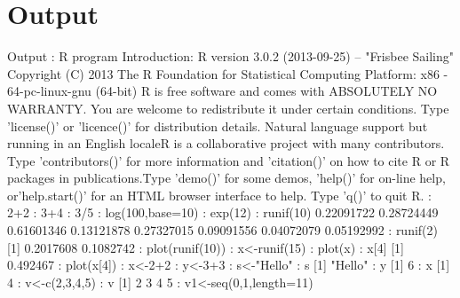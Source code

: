 \documentclass[10pt,a4paper]{article}
\begin{document}
{{\section{Output}
Output :
R program Introduction:
R version 3.0.2 (2013-09-25) -- "Frisbee Sailing"
\newline
Copyright (C) 2013 The R Foundation for Statistical Computing
Platform: x86 - 64-pc-linux-gnu (64-bit) R is free software and comes 
with ABSOLUTELY NO WARRANTY. You are welcome to redistribute it under certain conditions. Type 'license()' or 'licence()' for distribution details. Natural language support but running in an English localeR is a collaborative project with many contributors. Type 'contributors()' for more information and 'citation()' on how to cite R or R packages in publications.Type 'demo()' for some demos, 'help()' for on-line help, or'help.start()' for an HTML browser interface to help. Type 'q()' to quit R.
\newline
: 2+2
\newline
: 3+4
\newline
: 3/5
\newline
: log(100,base=10)
\newline
: exp(12)
\newline
: runif(10)
 0.22091722 0.28724449 0.61601346 0.13121878 0.27327015
 0.09091556 0.04072079 0.05192992
\newline
: runif(2)
[1] 0.2017608 0.1082742
\newline
: plot(runif(10))
\newline
: x<-runif(15)
\newline
: plot(x)
\newline
: x[4]
[1] 0.492467
\newline
: plot(x[4])
\newline
: x<-2+2
\newline
: y<-3+3
\newline
: s<-"Hello"
\newline
: s
[1] "Hello"
\newline
: y
[1] 6
\newline
: x
[1] 4
\newline
: v<-c(2,3,4,5)
\newline
: v
[1] 2 3 4 5
\newline
: v1<-seq(0,1,length=11)
\newline

}}
\end{document}

